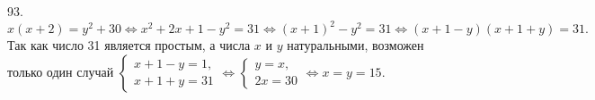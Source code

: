 93. $x(x+2)=y^2+30\Leftrightarrow x^2+2x+1-y^2=31\Leftrightarrow (x+1)^2-y^2=31\Leftrightarrow (x+1-y)(x+1+y)=31.$ Так как число 31 является простым, а числа $x$ и $y$ натуральными, возможен только один случай $\begin{cases}x+1-y=1,\\ x+1+y=31\end{cases}\Leftrightarrow \begin{cases}y=x,\\ 2x=30\end{cases}\Leftrightarrow
x=y=15.$\\

